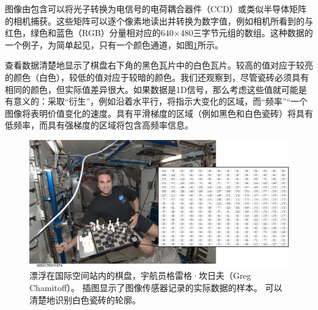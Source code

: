 图像由包含可以将光子转换为电信号的电荷耦合器件（CCD）或类似半导体矩阵的相机捕获。这些矩阵可以逐个像素地读出并转换为数字值，例如相机所看到的与红色，绿色和蓝色（RGB）分量相对应的640×480三字节元组的数组。这种数据的一个例子，为简单起见，只有一个颜色通道，如图\ref{fig:iss_closeup}所示。

查看数据清楚地显示了棋盘右下角的黑色瓦片中的白色瓦片。较高的值对应于较亮的颜色（白色），较低的值对应于较暗的颜色。我们还观察到，尽管瓷砖必须具有相同的颜色，但实际值差异很大。如果数据是1D信号，那么考虑这些值就可能是有意义的：采取“衍生”，例如沿着水平行，将指示大变化的区域，而“频率”“一个图像将表明价值变化的速度。具有平滑梯度的区域（例如黑色和白色瓷砖）将具有低频率，而具有强梯度的区域将包含高频率信息。


\begin{figure}[!htb]
	\centering
		\includegraphics[width=\textwidth]{figs/iss_closeupmatrix}
	\caption{漂浮在国际空间站内的棋盘，宇航员格雷格·坎日夫（Greg Chamitoff）。 插图显示了图像传感器记录的实际数据的样本。 可以清楚地识别白色瓷砖的轮廓。}
	\label{fig:iss_closeup}
\end{figure}


